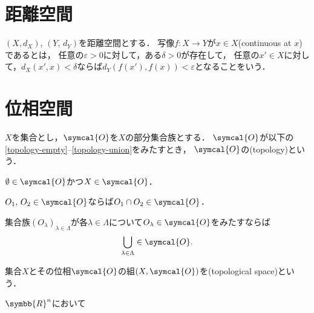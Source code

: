 \documentclass[../main.tex]{subfiles}
\begin{document}
\nocite{uchida}
\nocite{introduction-to-topology}

\section{距離空間}
\begin{thmbox}
\begin{definition}
\((X, d_{X})\), \((Y,\,d_{Y})\)を距離空間とする．
写像\(f\colon X \to Y\)が\(x \in X\)(continuous at \(x\))であるとは，
任意の\(\varepsilon > 0\)に対して，ある\(\delta > 0\)が存在して，
任意の\(x' \in X\)に対して，\(d_{X}(x', x) < \delta\)ならば\(d_{Y}(f(x'), f(x)) < \varepsilon\)となることをいう．
\end{definition}
\end{thmbox}


\section{位相空間}
\begin{thmbox}
\begin{definition}
\(X\)を集合とし，\(\symcal{O}\)を\(X\)の部分集合族とする．
\(\symcal{O}\)が以下の\ref{topology-empty}--\ref{topology-union}をみたすとき，
\(\symcal{O}\)の(topology)という．
\begin{conditions}
    \item\label{topology-empty} \(\emptyset \in \symcal{O}\)かつ\(X \in \symcal{O}\)．
    \item\label{topology-intersection} \(O_1,\,O_2 \in \symcal{O}\)ならば\(O_1 \cap O_2 \in \symcal{O}\)．
    \item\label{topology-union} 集合族\({(O_\lambda)}_{\lambda \in \Lambda}\)が各\(\lambda \in \Lambda\)について\(O_\lambda \in \symcal{O}\)をみたすならば
        \begin{align}
            \bigcup_{\lambda \in \Lambda} \in \symcal{O}.
        \end{align}
\end{conditions}
集合\(X\)とその位相\(\symcal{O}\)の組\((X, \symcal{O})\)を(topological space)という．
\end{definition}
\end{thmbox}

\begin{thmbox}
\begin{definition}
\(\symbb{R}^n\)において
\end{definition}
\end{thmbox}
\end{document}
